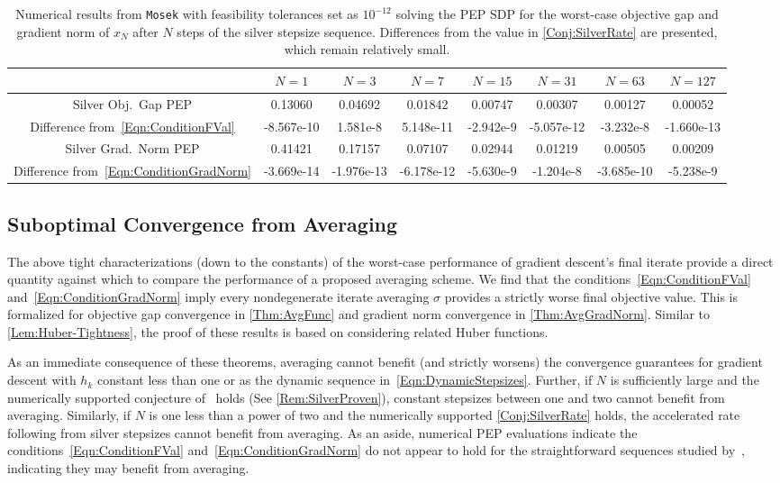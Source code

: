 \documentclass[11pt]{article}
\numberwithin{equation}{section}
\theoremstyle{definition}
\theoremstyle{definition}
\theoremstyle{definition}
\newcommand{\1}{\mathbf{1}}
\begin{document}
\begin{table}
    \centering\footnotesize
    \begin{tabular}{|c|c|c|c|c|c|c|c|}
    \hline
         & $N=1$ & $N=3$ & $N=7$ & $N=15$ & $N=31$ & $N=63$ & $N=127$\\
         \hline
         Silver Obj.~Gap PEP & 0.13060 & 0.04692 & 0.01842 & 0.00747 & 0.00307 & 0.00127 & 0.00052\\
         Difference from~\eqref{Eqn:ConditionFVal} &-8.567e-10 & 1.581e-8 & 5.148e-11 & -2.942e-9 & -5.057e-12 & -3.232e-8 & -1.660e-13\\
         \hline
         Silver Grad.~Norm PEP & 0.41421 & 0.17157 & 0.07107 & 0.02944 & 0.01219 & 0.00505 & 0.00209 \\
         Difference from~\eqref{Eqn:ConditionGradNorm} & -3.669e-14 & -1.976e-13 & -6.178e-12 & -5.630e-9 & -1.204e-8 & -3.685e-10 & -5.238e-9 \\    
         \hline
    \end{tabular}
    \caption{Numerical results from \texttt{Mosek} with feasibility tolerances set as $10^{-12}$ solving the PEP SDP for the worst-case objective gap and gradient norm of $x_N$ after $N$ steps of the silver stepsize sequence. Differences from the value in \cref{Conj:SilverRate} are presented, which remain relatively small.}
    \label{Tbl:SilverNumerics}
\end{table}

\subsection{Suboptimal Convergence from Averaging}\label{SubSect:AvgTheory}
The above tight characterizations (down to the constants) of the worst-case performance of gradient descent's final iterate provide a direct quantity against which to compare the performance of a proposed averaging scheme. We find that the conditions~\eqref{Eqn:ConditionFVal} and~\eqref{Eqn:ConditionGradNorm} imply every nondegenerate iterate averaging $\sigma$ provides a strictly worse final objective value. This is formalized for objective gap convergence in \cref{Thm:AvgFunc} and gradient norm convergence in \cref{Thm:AvgGradNorm}. Similar to \cref{Lem:Huber-Tightness}, the proof of these results is based on considering related Huber functions.

As an immediate consequence of these theorems, averaging cannot benefit (and strictly worsens) the convergence guarantees for gradient descent with $h_k$ constant less than one or as the dynamic sequence in~\eqref{Eqn:DynamicStepsizes}. Further, if $N$ is sufficiently large and the numerically supported conjecture of~\cite[Conjecture 3.1]{FirstPEP} holds (See \cref{Rem:SilverProven}), constant stepsizes between one and two cannot benefit from averaging. Similarly, if $N$ is one less than a power of two and the numerically supported \cref{Conj:SilverRate} holds, the accelerated rate following from silver stepsizes cannot benefit from averaging.
As an aside, numerical PEP evaluations indicate the conditions~\eqref{Eqn:ConditionFVal} and~\eqref{Eqn:ConditionGradNorm} do not appear to hold for the straightforward sequences studied by~\cite{Grimmer_LongStep,Grimmer_Accel}, indicating they may benefit from averaging.
\end{document}
